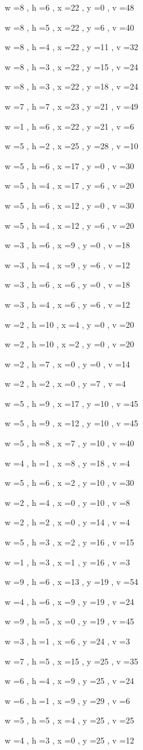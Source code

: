 \documentclass[11pt]{article}
\begin{document}
w =8 , h =6 , x =22 , y =0 , v =48
\par
w =8 , h =5 , x =22 , y =6 , v =40
\par
w =8 , h =4 , x =22 , y =11 , v =32
\par
w =8 , h =3 , x =22 , y =15 , v =24
\par
w =8 , h =3 , x =22 , y =18 , v =24
\par
w =7 , h =7 , x =23 , y =21 , v =49
\par
w =1 , h =6 , x =22 , y =21 , v =6
\par
w =5 , h =2 , x =25 , y =28 , v =10
\par
w =5 , h =6 , x =17 , y =0 , v =30
\par
w =5 , h =4 , x =17 , y =6 , v =20
\par
w =5 , h =6 , x =12 , y =0 , v =30
\par
w =5 , h =4 , x =12 , y =6 , v =20
\par
w =3 , h =6 , x =9 , y =0 , v =18
\par
w =3 , h =4 , x =9 , y =6 , v =12
\par
w =3 , h =6 , x =6 , y =0 , v =18
\par
w =3 , h =4 , x =6 , y =6 , v =12
\par
w =2 , h =10 , x =4 , y =0 , v =20
\par
w =2 , h =10 , x =2 , y =0 , v =20
\par
w =2 , h =7 , x =0 , y =0 , v =14
\par
w =2 , h =2 , x =0 , y =7 , v =4
\par
w =5 , h =9 , x =17 , y =10 , v =45
\par
w =5 , h =9 , x =12 , y =10 , v =45
\par
w =5 , h =8 , x =7 , y =10 , v =40
\par
w =4 , h =1 , x =8 , y =18 , v =4
\par
w =5 , h =6 , x =2 , y =10 , v =30
\par
w =2 , h =4 , x =0 , y =10 , v =8
\par
w =2 , h =2 , x =0 , y =14 , v =4
\par
w =5 , h =3 , x =2 , y =16 , v =15
\par
w =1 , h =3 , x =1 , y =16 , v =3
\par
w =9 , h =6 , x =13 , y =19 , v =54
\par
w =4 , h =6 , x =9 , y =19 , v =24
\par
w =9 , h =5 , x =0 , y =19 , v =45
\par
w =3 , h =1 , x =6 , y =24 , v =3
\par
w =7 , h =5 , x =15 , y =25 , v =35
\par
w =6 , h =4 , x =9 , y =25 , v =24
\par
w =6 , h =1 , x =9 , y =29 , v =6
\par
w =5 , h =5 , x =4 , y =25 , v =25
\par
w =4 , h =3 , x =0 , y =25 , v =12
\par
\newpage
\end{document}

